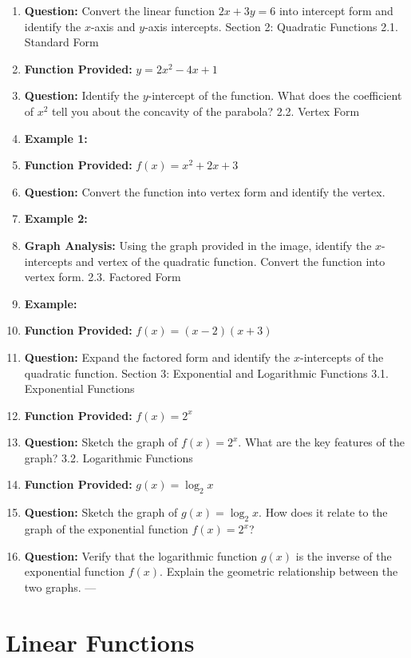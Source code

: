 \begin{enumerate}
    \item \textbf{Question:} Convert the linear function $2x + 3y = 6$ into intercept form and identify the $x$-axis and $y$-axis intercepts. Section 2: Quadratic Functions 2.1. Standard Form
    \item \textbf{Function Provided:} $y = 2x^2 - 4x + 1$
    \item \textbf{Question:} Identify the $y$-intercept of the function. What does the coefficient of $x^2$ tell you about the concavity of the parabola? 2.2. Vertex Form
    \item \textbf{Example 1:}
    \item \textbf{Function Provided:} $f(x) = x^2 + 2x + 3$
    \item \textbf{Question:} Convert the function into vertex form and identify the vertex.
    \item \textbf{Example 2:}
    \item \textbf{Graph Analysis:} Using the graph provided in the image, identify the $x$-intercepts and vertex of the quadratic function. Convert the function into vertex form. 2.3. Factored Form
    \item \textbf{Example:}
    \item \textbf{Function Provided:} $f(x) = (x - 2)(x + 3)$
    \item \textbf{Question:} Expand the factored form and identify the $x$-intercepts of the quadratic function. Section 3: Exponential and Logarithmic Functions 3.1. Exponential Functions
    \item \textbf{Function Provided:} $f(x) = 2^x$
    \item \textbf{Question:} Sketch the graph of $f(x) = 2^x$. What are the key features of the graph? 3.2. Logarithmic Functions
    \item \textbf{Function Provided:} $g(x) = \log_2 x$
    \item \textbf{Question:} Sketch the graph of $g(x) = \log_2 x$. How does it relate to the graph of the exponential function $f(x) = 2^x$?
    \item \textbf{Question:} Verify that the logarithmic function $g(x)$ is the inverse of the exponential function $f(x)$. Explain the geometric relationship between the two graphs. ---
\end{enumerate}

\section{Linear Functions}
\label{sec:linear-functions}

